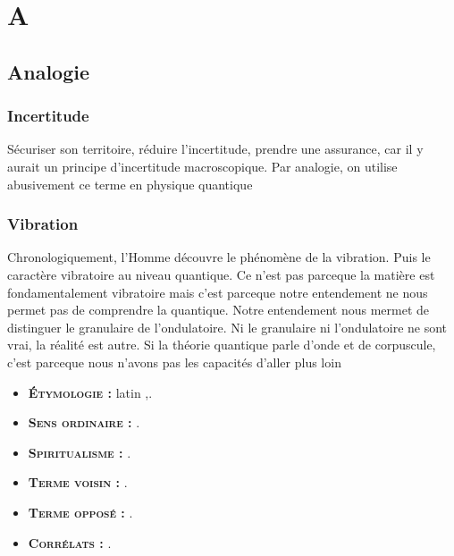 \chapter{A}
\section{Analogie}





\subsection{Incertitude}

Sécuriser son territoire, réduire l'incertitude, prendre une assurance,
car il y aurait un principe d'incertitude macroscopique.
Par analogie, on utilise abusivement ce terme en physique quantique

\subsection{Vibration}

Chronologiquement, l'Homme découvre le phénomène de la vibration.
Puis le caractère vibratoire au niveau quantique. Ce n'est pas parceque
la matière est fondamentalement vibratoire mais c'est parceque notre
entendement ne nous permet pas de comprendre la quantique. Notre
entendement nous mermet de distinguer le granulaire de l'ondulatoire.
Ni le granulaire ni l'ondulatoire ne sont vrai, la réalité est autre.
Si la théorie quantique parle d'onde et de corpuscule, c'est parceque
nous n'avons pas les capacités d'aller plus loin






{\footnotesize
\begin{itemize}[leftmargin=1cm, label=, itemsep=1pt]
\item {\bf \textsc{Étymologie} :} latin {\it },.
\item {\bf \textsc{Sens ordinaire} :} .
\item {\bf \textsc{Spiritualisme} :} .
\end{itemize}

\begin{itemize}[leftmargin=1cm, label=, itemsep=1pt]
\item {\bf \textsc{Terme voisin} :} .
\item {\bf \textsc{Terme opposé} :} .
\item {\bf \textsc{Corrélats} :} .
\end{itemize}
}
